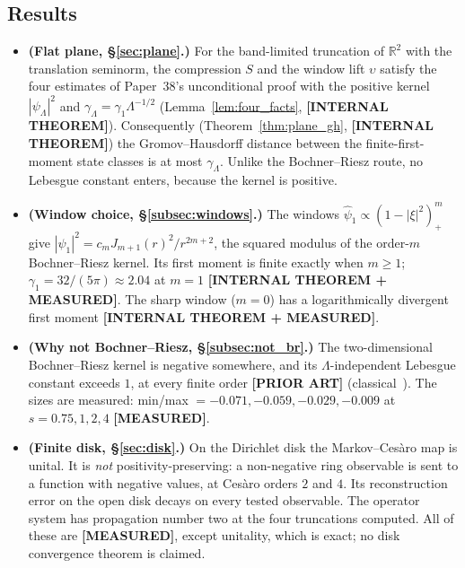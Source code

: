 \documentclass[11pt,a4paper]{article}
\theoremstyle{plain}
\theoremstyle{definition}
\newcommand{\R}{\mathbb{R}}
\begin{document}
\subsection{Results}
\begin{itemize}
\item \textbf{(Flat plane, \S\ref{sec:plane}.)} For the band-limited
truncation of $\R^{2}$ with the translation seminorm, the compression
$S$ and the window lift $\upsilon$ satisfy the four estimates of
Paper~38's unconditional proof with the positive kernel
$|\psi_{\Lambda}|^{2}$ and $\gamma_{\Lambda}=\gamma_{1}\Lambda^{-1/2}$
(Lemma~\ref{lem:four_facts}, \textbf{[INTERNAL THEOREM]}). Consequently
(Theorem~\ref{thm:plane_gh}, \textbf{[INTERNAL THEOREM]}) the Gromov--Hausdorff
distance between the finite-first-moment state classes is at most
$\gamma_{\Lambda}$. Unlike the Bochner--Riesz route, no Lebesgue constant
enters, because the kernel is positive.
\item \textbf{(Window choice, \S\ref{subsec:windows}.)} The windows
$\widehat\psi_{1}\propto(1-|\xi|^{2})_{+}^{m}$ give
$|\psi_{1}|^{2}=c_{m}J_{m+1}(r)^{2}/r^{2m+2}$, the squared modulus of the
order-$m$ Bochner--Riesz kernel. Its first moment is finite exactly when
$m\ge1$; $\gamma_{1}=32/(5\pi)\approx2.04$ at $m=1$
\textbf{[INTERNAL THEOREM + MEASURED]}. The sharp window ($m=0$) has a
logarithmically divergent first moment \textbf{[INTERNAL THEOREM +
MEASURED]}.
\item \textbf{(Why not Bochner--Riesz, \S\ref{subsec:not_br}.)} The
two-dimensional Bochner--Riesz kernel is negative somewhere, and its
$\Lambda$-independent Lebesgue constant exceeds $1$, at every finite order
\textbf{[PRIOR ART]} (classical~\cite{stein_weiss}). The sizes are measured: min/max
$=-0.071,-0.059,-0.029,-0.009$ at $s=0.75,1,2,4$ \textbf{[MEASURED]}.
\item \textbf{(Finite disk, \S\ref{sec:disk}.)} On the Dirichlet disk the
Markov--Ces\`aro map is unital. It is \emph{not}
positivity-preserving: a non-negative ring observable is sent to a function
with negative values, at Ces\`aro orders $2$ and $4$. Its reconstruction
error on the open disk decays on every tested observable. The operator
system has propagation number two at the four truncations computed. All
of these are \textbf{[MEASURED]}, except unitality, which is exact; no disk
convergence theorem is claimed.
\end{itemize}
\end{document}
